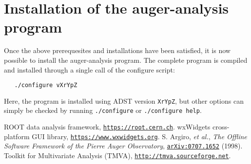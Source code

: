 \documentclass[12pt,a4paper]{report}
\begin{document}
\section{Installation of the auger-analysis program} \label{sec:install}
Once the above prerequesites and installations have been satisfied, it is now possible to install the auger-analysis program. The complete program is compiled and installed through a single call of the configure script:
\begin{verbatim}
   ./configure vXrYpZ
\end{verbatim}
Here, the program is installed using ADST version \texttt{XrYpZ}, but other options can simply be checked by running \texttt{./configure} or \texttt{./configure help}.

\pagebreak
\begin{thebibliography}{50} 
\raggedright
{} ROOT data analysis framework, \href{https://root.cern.ch}{\texttt{https://root.cern.ch}}.
 wxWidgets cross-platform GUI library, \href{https://www.wxwidgets.org}{\texttt{https://www.wxwidgets.org}}.
 S. Argiro, \emph{et al.}, \emph{The Offline Software Framework of the Pierre Auger Observatory}, \href{http://arxiv.org/pdf/0707.1652v1.pdf}{\texttt{arXiv:0707.1652}} (1998).
 Toolkit for Multivariate Analysis (TMVA), \href{http://tmva.sourceforge.net}{\texttt{http://tmva.sourceforge.net}}.
\end{thebibliography}
\end{document}
